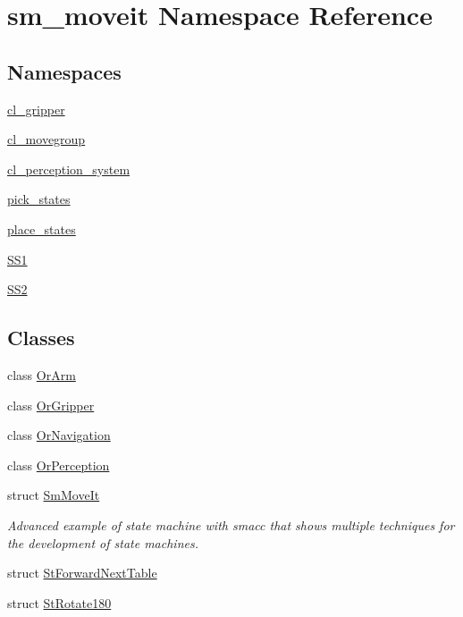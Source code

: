 \hypertarget{namespacesm__moveit}{}\section{sm\+\_\+moveit Namespace Reference}
\label{namespacesm__moveit}
\subsection*{Namespaces}
\begin{DoxyCompactItemize}
\item 
 \hyperlink{namespacesm__moveit_1_1cl__gripper}{cl\+\_\+gripper}
\item 
 \hyperlink{namespacesm__moveit_1_1cl__movegroup}{cl\+\_\+movegroup}
\item 
 \hyperlink{namespacesm__moveit_1_1cl__perception__system}{cl\+\_\+perception\+\_\+system}
\item 
 \hyperlink{namespacesm__moveit_1_1pick__states}{pick\+\_\+states}
\item 
 \hyperlink{namespacesm__moveit_1_1place__states}{place\+\_\+states}
\item 
 \hyperlink{namespacesm__moveit_1_1SS1}{S\+S1}
\item 
 \hyperlink{namespacesm__moveit_1_1SS2}{S\+S2}
\end{DoxyCompactItemize}
\subsection*{Classes}
\begin{DoxyCompactItemize}
\item 
class \hyperlink{classsm__moveit_1_1OrArm}{Or\+Arm}
\item 
class \hyperlink{classsm__moveit_1_1OrGripper}{Or\+Gripper}
\item 
class \hyperlink{classsm__moveit_1_1OrNavigation}{Or\+Navigation}
\item 
class \hyperlink{classsm__moveit_1_1OrPerception}{Or\+Perception}
\item 
struct \hyperlink{structsm__moveit_1_1SmMoveIt}{Sm\+Move\+It}
\begin{DoxyCompactList}\small\item\em Advanced example of state machine with smacc that shows multiple techniques for the development of state machines. \end{DoxyCompactList}\item 
struct \hyperlink{structsm__moveit_1_1StForwardNextTable}{St\+Forward\+Next\+Table}
\item 
struct \hyperlink{structsm__moveit_1_1StRotate180}{St\+Rotate180}
\end{DoxyCompactItemize}
